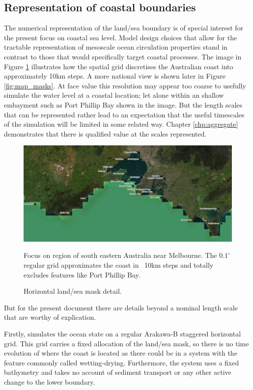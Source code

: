 \subsection{Representation of coastal boundaries}
The numerical representation of the land/sea boundary is of special interest for the present focus on coastal sea level.
Model design choices that allow for the tractable representation of mesoscale ocean circulation properties stand in contrast to those that would specifically target coastal processes.
The image in Figure \ref{fig:oceanmapsMaskDetail} illustrates how the \BL{} spatial grid discretises the Australian coast into approximately 10km steps.  A more national view is shown later in Figure \ref{fig:map_masks}.
At face value this resolution may appear too coarse to usefully simulate the water level at a coastal location; let alone within an shallow embayment such as Port Phillip Bay shown in the image.    But the length scales that can be represented rather lead to an expectation that the useful timescales of the simulation will be limited in some related way.   Chapter \ref{chp:aggregate} demonstrates that there is qualified value at the scales represented.
\begin{figure}[!hbt] \centering
    \includegraphics[width=\figwidthBig]{figures/images/oceanmapsMaskVic.png}
    \caption{Horizontal land/sea mask detail.}
            {Focus on region of south eastern Australia near Melbourne. The $0.1^{\circ}$ regular grid approximates the coast in ~10km steps and totally excludes features like Port Phillip Bay.}
    \label{fig:oceanmapsMaskDetail}
\end{figure}
But for the present document there are details beyond a nominal length scale that are worthy of explication.

Firstly, \BL{} simulates the ocean state on a regular Arakawa-B staggered horizontal grid.
This grid carries a fixed allocation of the land/sea mask, so there is no time evolution of where the coast is located as there could be in a system with the feature commonly called wetting-drying.
Furthermore, the system uses a fixed bathymetry and takes no account of sediment transport or any other active change to the lower boundary.

